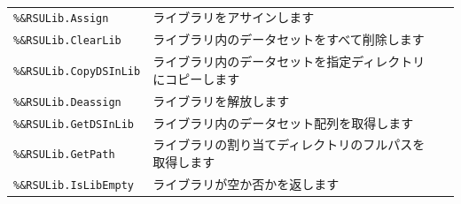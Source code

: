\paragraph{\DocStrTitleRDMPackageFunctionList}
\begin{center}
{\footnotesize
\begin{xltabular}{\textwidth}{|p{4truecm}|X|p{1.2truecm}|}
\hline
\thead{\DocStrHeaderFunctionName}&\thead{\DocStrDescription}&\thead{\DocStrRefto}\\
\hline
\hline
\texttt{\%\&RSULib.Assign}&ライブラリをアサインします&\\
\hline
\texttt{\%\&RSULib.ClearLib}&ライブラリ内のデータセットをすべて削除します&\\
\hline
\texttt{\%\&RSULib.CopyDSInLib}&ライブラリ内のデータセットを指定ディレクトリにコピーします&\\
\hline
\texttt{\%\&RSULib.Deassign}&ライブラリを解放します&\\
\hline
\texttt{\%\&RSULib.GetDSInLib}&ライブラリ内のデータセット配列を取得します&\\
\hline
\texttt{\%\&RSULib.GetPath}&ライブラリの割り当てディレクトリのフルパスを取得します&\\
\hline
\texttt{\%\&RSULib.IsLibEmpty}&ライブラリが空か否かを返します&\\
\hline
\end{xltabular}
}
\end{center}
